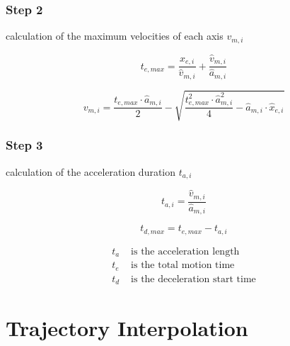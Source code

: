 \documentclass[%
  professionalfonts,%
  xcolor={%
    usenames,%
    dvipsnames,%
    svgnames,%
    table,%
    hyperref%
  }%
]{beamer}
\begin{document}
\subsubsection{Step 2}
\begin{frame}
calculation of the maximum velocities of each axis $v_{m,i}$

\begin{equation*}
t_{e,max} = \frac{\hat{x}_{e,i}}{\hat{v}_{m,i}}+\frac{\hat{v}_{m,i}}{\hat{a}_{m,i}}
\end{equation*}


\begin{equation}
v_{m,i} = \frac{t_{e,max} \cdot \hat{a}_{m,i}}{2}-\sqrt{\frac{t_{e,max}^2 \cdot \hat{a}_{m,i}^2}{4}-\hat{a}_{m,i}\cdot \hat{x}_{e,i}}
\end{equation}
\end{frame}
  
\subsubsection{Step 3}
\begin{frame}
calculation of the acceleration duration $t_{a,i}$

\begin{equation}
t_{a,i} = \frac{\hat{v}_{m,i}}{\hat{a}_{m,i}}
\end{equation}

\begin{equation}
t_{d,max} = t_{e,max}-t_{a,i}
\end{equation}      

\begin{align*}
t_{a} & \text{ is the acceleration length} \\
t_{e} & \text{ is the total motion time} \\
t_{d} & \text{ is the deceleration start time}
\end{align*}
\end{frame}

\section{Trajectory Interpolation}
\end{document}
